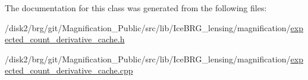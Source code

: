 The documentation for this class was generated from the following files\-:\begin{DoxyCompactItemize}
\item 
/disk2/brg/git/\-Magnification\-\_\-\-Public/src/lib/\-Ice\-B\-R\-G\-\_\-lensing/magnification/\hyperlink{expected__count__derivative__cache_8h}{expected\-\_\-count\-\_\-derivative\-\_\-cache.\-h}\item 
/disk2/brg/git/\-Magnification\-\_\-\-Public/src/lib/\-Ice\-B\-R\-G\-\_\-lensing/magnification/\hyperlink{expected__count__derivative__cache_8cpp}{expected\-\_\-count\-\_\-derivative\-\_\-cache.\-cpp}\end{DoxyCompactItemize}
